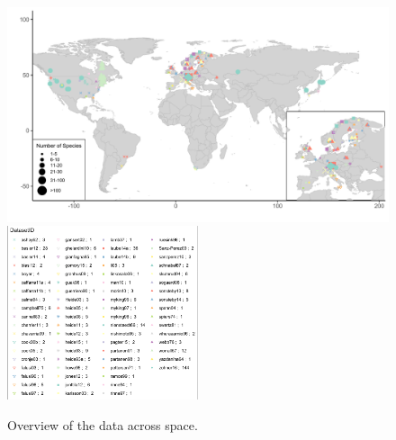 \documentclass[11pt,letter]{article}
\begin{document}
\clearpage

\begin{figure}[t!]
\centering
\includegraphics[width=1\textwidth]{..//..//analyses/limitingcues/figures/maps/map_studyspp.pdf}
\includegraphics[width=0.5\textwidth]{..//..//analyses/limitingcues/figures/maps/map_studyspp_legend.pdf}
\caption{Overview of the data across space.}
  \label{fig:datamap} %
\end{figure}
\end{document}

